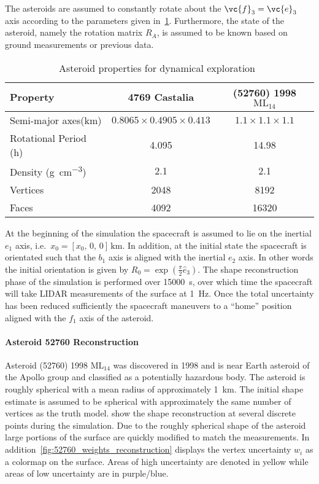 \documentclass[smallextended]{svjour3}       %
\begin{document}
The asteroids are assumed to constantly rotate about the \( \vc{f}_3 = \vc{e}_3\) axis according to the parameters given in~\cref{tab:dynamic_asteroids}.
Furthermore, the state of the asteroid, namely the rotation matrix \( R_A \), is assumed to be known based on ground measurements or previous data.
\begin{table}[htbp]
    \centering
    \begin{tabular}{lcc}
        \toprule
        Property & \num{4769} Castalia & (\num{52760}) \num{1998} \(\text{ML}_{14}\) \\
        \midrule
        Semi-major axes(\si{\kilo\meter}) & \( 0.8065 \times 0.4905 \times 0.413 \) & \( 1.1 \times 1.1 \times 1.1 \) \\
        Rotational Period (\si{\hour}) & \num{4.095} & \num{14.98} \\
        Density (\si{\gram\per\centi\meter^3}) & \num{2.1} & \num{2.1} \\
        Vertices & \num{2048}  & \num{8192} \\
        Faces & \num{4092} & \num{16320} \\
        \bottomrule
    \end{tabular}
    \caption{Asteroid properties for dynamical exploration~\label{tab:dynamic_asteroids}}
\end{table}
At the beginning of the simulation the spacecraft is assumed to lie on the inertial \( e_1 \) axis, i.e.\ \( x_0 = [ x_0,\, 0,\,  0 ]\, \si{\kilo\meter} \).
In addition, at the initial state the spacecraft is orientated such that the \( b_1 \) axis is aligned with the inertial \( e_2 \) axis.
In other words the initial orientation is given by \( R_0 = \exp(\frac{\pi}{2} \hat{e}_3)\).
The shape reconstruction phase of the simulation is performed over \SI{15000}{\second}, over which time the spacecraft will take LIDAR measurements of the surface at \SI{1}{\hertz}.
Once the total uncertainty has been reduced sufficiently the spacecraft maneuvers to a ``home'' position aligned with the \( f_1 \) axis of the asteroid.

\paragraph{Asteroid 52760 Reconstruction}

Asteroid (\num{52760}) \num{1998} \(\text{ML}_{14}\) was discovered in \num{1998} and is near Earth asteroid of the Apollo group and classified as a potentially hazardous body.
The asteroid is roughly spherical with a mean radius of approximately \SI{1}{\kilo\meter}.
The initial shape estimate is assumed to be spherical with approximately the same number of vertices as the truth model.
 show the shape reconstruction at several discrete points during the simulation.
Due to the roughly spherical shape of the asteroid large portions of the surface are quickly modified to match the measurements.
In addition~\cref{fig:52760_weights_reconstruction} displays the vertex uncertainty \( w_i \) as a colormap on the surface. 
Areas of high uncertainty are denoted in yellow while areas of low uncertainty are in purple/blue.
\end{document}
